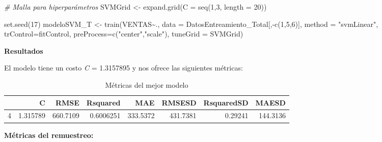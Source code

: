 \documentclass[
]{article}
\newenvironment{Shaded}{\begin{snugshade}}{\end{snugshade}}
\newcommand{\AttributeTok}[1]{\textcolor[rgb]{0.77,0.63,0.00}{#1}}
\newcommand{\CommentTok}[1]{\textcolor[rgb]{0.56,0.35,0.01}{\textit{#1}}}
\newcommand{\DecValTok}[1]{\textcolor[rgb]{0.00,0.00,0.81}{#1}}
\newcommand{\FunctionTok}[1]{\textcolor[rgb]{0.00,0.00,0.00}{#1}}
\newcommand{\NormalTok}[1]{#1}
\newcommand{\OtherTok}[1]{\textcolor[rgb]{0.56,0.35,0.01}{#1}}
\newcommand{\SpecialCharTok}[1]{\textcolor[rgb]{0.00,0.00,0.00}{#1}}
\newcommand{\StringTok}[1]{\textcolor[rgb]{0.31,0.60,0.02}{#1}}
\begin{document}
\begin{Shaded}
\begin{Highlighting}[]
\CommentTok{\# Malla para hiperparámetros}
\NormalTok{SVMGrid }\OtherTok{\textless{}{-}}  \FunctionTok{expand.grid}\NormalTok{(}\AttributeTok{C =} \FunctionTok{seq}\NormalTok{(}\DecValTok{1}\NormalTok{,}\DecValTok{3}\NormalTok{, }\AttributeTok{length =} \DecValTok{20}\NormalTok{))}

\FunctionTok{set.seed}\NormalTok{(}\DecValTok{17}\NormalTok{)}
\NormalTok{modeloSVM\_T }\OtherTok{\textless{}{-}} \FunctionTok{train}\NormalTok{(VENTAS}\SpecialCharTok{\textasciitilde{}}\NormalTok{., }
                \AttributeTok{data =}\NormalTok{ DatosEntreamiento\_Total[,}\SpecialCharTok{{-}}\FunctionTok{c}\NormalTok{(}\DecValTok{1}\NormalTok{,}\DecValTok{5}\NormalTok{,}\DecValTok{6}\NormalTok{)], }
                \AttributeTok{method =} \StringTok{"svmLinear"}\NormalTok{, }
                \AttributeTok{trControl=}\NormalTok{fitControl, }
                \AttributeTok{preProcess=}\FunctionTok{c}\NormalTok{(}\StringTok{"center"}\NormalTok{,}\StringTok{"scale"}\NormalTok{),}
                \AttributeTok{tuneGrid =}\NormalTok{ SVMGrid)}
\end{Highlighting}
\end{Shaded}

\textbf{Resultados}

El modelo tiene un costo \emph{C} = 1.3157895 y nos ofrece las
siguientes métricas:

\begin{table}[H]

\caption{\label{tab:unnamed-chunk-10}Métricas del mejor modelo}
\centering
\begin{tabular}[t]{lrrrrrrr}
\toprule
  & C & RMSE & Rsquared & MAE & RMSESD & RsquaredSD & MAESD\\
\midrule
4 & 1.315789 & 660.7109 & 0.6006251 & 333.5372 & 431.7381 & 0.29241 & 144.3136\\
\bottomrule
\end{tabular}
\end{table}

\textbf{Métricas del remuestreo:}
\end{document}
